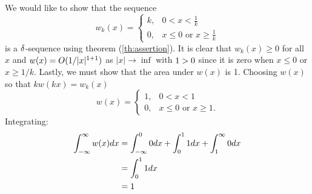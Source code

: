 \begin{example}
    We would like to show that the sequence
    \begin{equation*}
        w_k(x) = \begin{cases}
            k, &  0<x<\frac{1}{k}\\
            0, &x\leq 0 \text{ or } x \geq \frac{1}{k}
        \end{cases}
    \end{equation*}
    is a \(\delta\)-sequence using theorem (\ref{th:assertion}). It is clear that \(w_k(x)\geq 0\)  for all \(x\) and \(w(x)=O(1/|x|^{1+1})\) as \(|x| \rightarrow \inf\) with \(1>0\) since it is zero when \(x \leq 0\) or \(x \geq 1/k\). Lastly, we must show that the area under \(w(x)\) is 1. Choosing \(w(x)\) so that \(kw(kx)=w_k(x)\)
    \begin{equation*}
        w(x)=\begin{cases}
            1,& 0<x<1\\
            0,& x\leq0 \text{ or } x \geq 1.
        \end{cases}
    \end{equation*}
    Integrating:
    \begin{equation}
        \begin{split}
            \int_{-\infty}^{\infty} w(x) dx &= \int_{-\infty}^{0} 0 dx +\int_0^1 1 dx + \int_{1}^{\infty} 0 dx\\
            &=\int_0^1 1 dx\\
            &=1
        \end{split}
    \end{equation}
\end{example}

